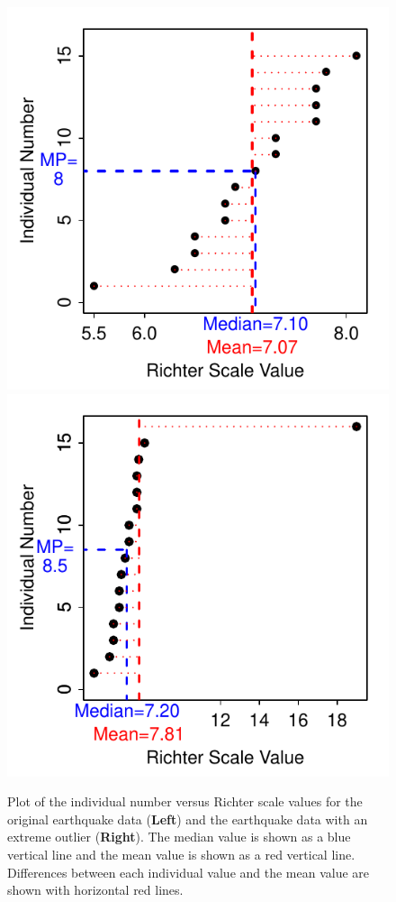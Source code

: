 \documentclass[10pt,openany]{book}\usepackage[]{graphicx}\usepackage[]{color}
\newenvironment{knitrout}{}{} %
\begin{document}
\begin{knitrout}
\color{fgcolor}\begin{figure}[hbtp]

{\centering \includegraphics[width=.45\linewidth]{Figs/MeanMedianComp1-1} 
\includegraphics[width=.45\linewidth]{Figs/MeanMedianComp1-2} 

}

\caption[Plot of the individual number versus Richter scale values for the original earthquake data (\textbf{Left}) and the earthquake data with an extreme outlier (\textbf{Right})]{Plot of the individual number versus Richter scale values for the original earthquake data (\textbf{Left}) and the earthquake data with an extreme outlier (\textbf{Right}). The median value is shown as a blue vertical line and the mean value is shown as a red vertical line. Differences between each individual value and the mean value are shown with horizontal red lines.}\label{fig:MeanMedianComp1}
\end{figure}


\end{knitrout}


\vspace{-12pt}
\end{document}
